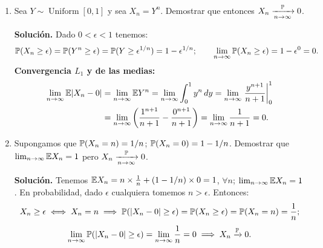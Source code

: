 \begin{enumerate}
  \textbf{Solución.} Sea $\omega \in (0,1)$; dado $n > 1/\omega$ es
  \[
    n > \frac{1}{\omega} \implies \omega \notin \left(0, \frac{1}{n}\right] \implies X_n(\omega) = 0, \quad \forall n > \frac{1}{\omega}\] 
    \[\implies \lim_{n\to\infty} X_n(\omega) = X_\infty(\omega) = 0, \quad \forall \omega \neq 0,
  \]
  pues si $n$ es suficientemente grande será $n > 1/\omega$. Por otro lado, $X_n = n^r$ para los $\omega < 1/n$ que tienen probabilidad $\lambda(0, 1/n]$, y $X_n = 0$ para los $\omega \ge 1/n$ que tienen probabilidad $\lambda[1/n, 1]$:
  \[
    \implies \E X_n = n^r \lambda\!\left(0, \frac{1}{n}\right] + 0\cdot \lambda\!\left(\frac{1}{n}, 1\right] = \frac{n^r}{n} + 0,
  \]
  \[
    \lim_{n\to\infty} \E X_n = \lim_{n\to\infty} n^{r-1} =
    \begin{cases}
      1, & r = 1, \\
      \infty, & r > 1,
    \end{cases} \neq \E 0 = 0.
  \]
  Luego hay convergencia casi segura $X_n \xrightarrow{\text{c.s.}} X_\infty = 0$, pero no de las medias.

  \emph{Razón:} $\lim_{n\to\infty} X_n(\omega) = X_\infty(\omega) = 0$, $\forall \omega \neq 0$, pero $\lim_{n\to\infty} X_n(0) = \infty$. Al calcular la media este punto tiene un gran peso y estropea la convergencia.

  \item Sea $Y \sim \operatorname{Uniform}[0, 1]$ y sea $X_n = Y^n$. Demostrar que entonces $X_n \xrightarrow[n\to\infty]{\mathbb{P}} 0$.

  \textbf{Solución.} Dado $0 < \epsilon < 1$ tenemos:
  \[
    \mathbb{P}(X_n \ge \epsilon) = \mathbb{P}(Y^n \ge \epsilon) = \mathbb{P}(Y \ge \epsilon^{1/n}) = 1 - \epsilon^{1/n}; \qquad \lim_{n\to\infty} \mathbb{P}(X_n \ge \epsilon) = 1 - \epsilon^0 = 0.
  \]
  \textbf{Convergencia $L_1$ y de las medias:}
  \begin{align*}
          \lim_{n\to\infty} \mathbb{E}|X_n - 0| & = \lim_{n\to\infty} \mathbb{E} Y^n = \lim_{n\to\infty} \int_0^1 y^n\,dy = \lim_{n\to\infty} \left.\frac{y^{n+1}}{n+1}\right|_0^1 \\ & = \lim_{n\to\infty} \left(\frac{1^{n+1}}{n+1} - \frac{0^{n+1}}{n+1}\right) = \lim_{n\to\infty} \frac{1}{n+1} = 0.
  \end{align*}
  \item Supongamos que $\mathbb{P}(X_n = n) = 1/n$; $\mathbb{P}(X_n = 0) = 1 - 1/n$. Demostrar que $\lim_{n\to\infty} \mathbb{E} X_n = 1$ pero $X_n \xrightarrow[n\to\infty]{\mathbb{P}} 0$.

  \textbf{Solución.} Tenemos $\mathbb{E} X_n = n \times \frac{1}{n} + (1 - 1/n) \times 0 = 1$, $\forall n$; $\lim_{n\to\infty} \mathbb{E} X_n = 1$. En probabilidad, dado $\epsilon$ cualquiera tomemos $n > \epsilon$. Entonces:
  \[
    X_n \ge \epsilon \iff X_n = n \implies \mathbb{P}(|X_n - 0| \ge \epsilon) = \mathbb{P}(X_n \ge \epsilon) = \mathbb{P}(X_n = n) = \frac{1}{n};
  \]
  \[
    \lim_{n\to\infty} \mathbb{P}(|X_n - 0| \ge \epsilon) = \lim_{n\to\infty} \frac{1}{n} = 0 \implies X_n \xrightarrow{\mathbb{P}} 0.
  \]


\end{enumerate}
